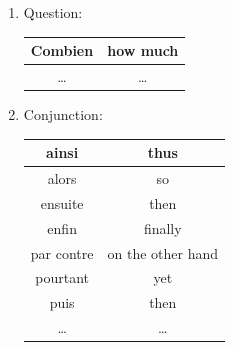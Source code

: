 \documentclass{book}
\begin{document}
\begin{enumerate}
            \item Question:
                \begin{center}
                    \begin{tabular}{|c|c|}
                        \hline
                        Combien & how much \\
                        \hline
                        \dots & \dots \\
                        \hline
                    \end{tabular}
                \end{center}

            \item Conjunction:
                \begin{center}
                    \begin{tabular}{|c|c|}
                        \hline
                        ainsi & thus \\
                        \hline
                        alors & so \\
                        \hline
                        ensuite & then \\
                        \hline
                        enfin & finally \\
                        \hline
                        par contre & on the other hand \\
                        \hline
                        pourtant & yet \\
                        \hline
                        puis & then \\
                        \hline
                        \dots & \dots \\
                        \hline
                    \end{tabular}
                \end{center}
        \end{enumerate}
\end{document}
